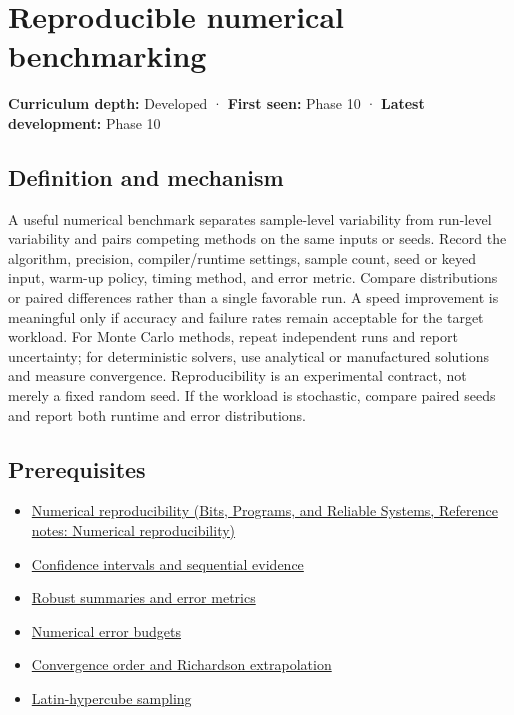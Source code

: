 \hypertarget{appendix-b9db93e28371}{}\label{referencestart:appendix-b9db93e28371}
\section{Reproducible numerical benchmarking}\label{appendix-b9db93e28371-reproducible-numerical-benchmarking}

\textbf{Curriculum depth:} Developed · \textbf{First seen:} Phase 10 · \textbf{Latest development:} Phase 10

\begin{allmightroledefinition}

\subsection{Definition and mechanism}\label{appendix-b9db93e28371-definition-and-mechanism}

A useful numerical benchmark separates sample-level variability from run-level variability and pairs competing methods on the same inputs or seeds. Record the algorithm, precision, compiler/runtime settings, sample count, seed or keyed input, warm-up policy, timing method, and error metric. Compare distributions or paired differences rather than a single favorable run. A speed improvement is meaningful only if accuracy and failure rates remain acceptable for the target workload. For Monte Carlo methods, repeat independent runs and report uncertainty; for deterministic solvers, use analytical or manufactured solutions and measure convergence. Reproducibility is an experimental contract, not merely a fixed random seed. If the workload is stochastic, compare paired seeds and report both runtime and error distributions.

\end{allmightroledefinition}

\subsection{Prerequisites}\label{appendix-b9db93e28371-prerequisites}

\begin{itemize}
\tightlist
\item
  \href{../01-Bits-Programs-and-Reliable-Systems/main.pdf\#nameddest=appendix-5f1a2c3f97ff}{Numerical reproducibility (Bits, Programs, and Reliable Systems, Reference notes: Numerical reproducibility)}
\item
  \hyperref[appendix-c83016554b1e]{Confidence intervals and sequential evidence}
\item
  \hyperref[appendix-bcc44e9d3d02]{Robust summaries and error metrics}
\item
  \hyperref[appendix-31b8c295e05f]{Numerical error budgets}
\item
  \hyperref[appendix-aca80b6bf17a]{Convergence order and Richardson extrapolation}
\item
  \hyperref[appendix-1c5e85693a06]{Latin-hypercube sampling}
\end{itemize}

